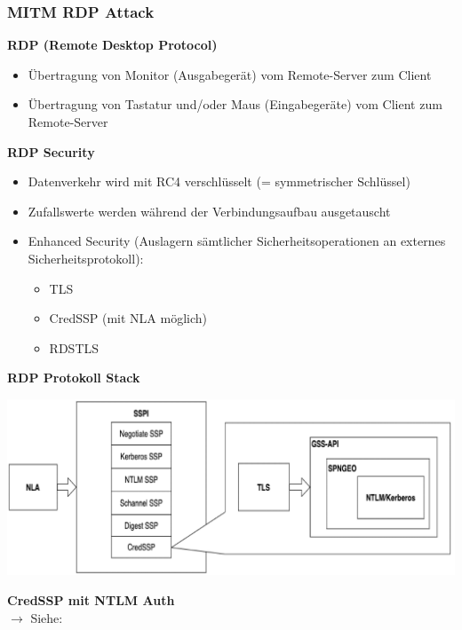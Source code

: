 \subsubsection{MITM RDP Attack}
\textbf{RDP (Remote Desktop Protocol)}
\begin{itemize}
    \item Übertragung von Monitor (Ausgabegerät) vom Remote-Server zum Client
    \item Übertragung von Tastatur und/oder Maus (Eingabegeräte) vom Client zum Remote-Server
\end{itemize}
\textbf{RDP Security}
\begin{itemize}
    \item Datenverkehr wird mit RC4 verschlüsselt (= symmetrischer Schlüssel)
    \item Zufallswerte werden während der Verbindungsaufbau ausgetauscht
    \item Enhanced Security (Auslagern sämtlicher Sicherheitsoperationen an externes Sicherheitsprotokoll):
    \begin{itemize}
        \item TLS
        \item CredSSP (mit NLA möglich)
        \item RDSTLS
    \end{itemize}
\end{itemize}
\textbf{RDP Protokoll Stack}
\begin{center}
    \vspace{-8pt}
    \includegraphics[width=1.0\linewidth]{./img/09-mitm/rdp_proto}
    \vspace{-8pt}
\end{center}
\textbf{CredSSP mit NTLM Auth}\\
$\rightarrow$ Siehe: 

